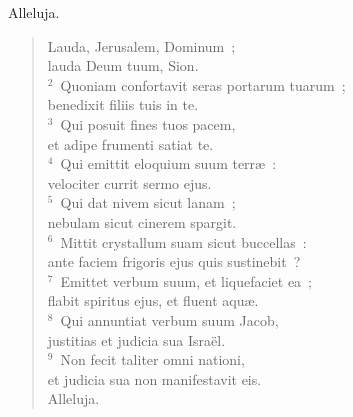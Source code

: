 \bchapter
\lettrine[lines=3,image=true,loversize=0.05,lraise=-0.03]{A}{}lleluja. \begin{flushleft}\begin{verse}\vspace{6pt}Lauda, Jerusalem, Dominum~;\\ lauda Deum tuum, Sion.\\
${}^{2}$~Quoniam confortavit seras portarum tuarum~;\\ benedixit filiis tuis in te.\\
${}^{3}$~Qui posuit fines tuos pacem,\\ et adipe frumenti satiat te.\\
${}^{4}$~Qui emittit eloquium suum terr\ae~:\\ velociter currit sermo ejus.\\
${}^{5}$~Qui dat nivem sicut lanam~;\\ nebulam sicut cinerem spargit.\\
${}^{6}$~Mittit crystallum suam sicut buccellas~:\\ ante faciem frigoris ejus quis sustinebit~?\\
${}^{7}$~Emittet verbum suum, et liquefaciet ea~;\\ flabit spiritus ejus, et fluent aqu\ae .\\
${}^{8}$~Qui annuntiat verbum suum Jacob,\\ justitias et judicia sua Isra\"el.\\
${}^{9}$~Non fecit taliter omni nationi,\\ et judicia sua non manifestavit eis.\\ Alleluja.\end{verse}\end{flushleft}



